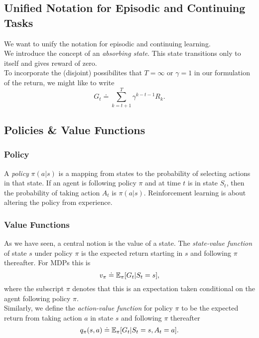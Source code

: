 \subsection{Unified Notation for Episodic and Continuing Tasks}
We want to unify the notation for episodic and continuing learning. \\

We introduce the concept of an \emph{absorbing state}. This state transitions only to itself and gives reward of zero.\\

To incorporate the (disjoint) possibilites that $T=\infty$ or $\gamma = 1$ in our formulation of the return, we might like to write
\begin{equation}
    G_t \doteq \sum_{k=t+1}^T \gamma^{k-t-1}R_k.
\end{equation}


\subsection{Policies \& Value Functions}
\subsubsection*{Policy}
A \emph{policy} $\pi(a|s)$ is a mapping from states to the probability of selecting actions in that state. If an agent is following policy $\pi$ and at time $t$ is in state $S_t$, then the probability of taking action $A_t$ is $\pi(a|s)$. Reinforcement learning is about altering the policy from experience.\\

\subsubsection*{Value Functions}
As we have seen, a central notion is the value of a state. The \emph{state-value function} of state $s$ under policy $\pi$ is the expected return starting in $s$ and following $\pi$ thereafter. For MDPs this is
\begin{equation}
    v_\pi \doteq \mathbb{E}_\pi[G_t | S_t = s],
\end{equation}
where the subscript $\pi$ denotes that this is an expectation taken conditional on the agent following policy $\pi$. \\

Similarly, we define the \emph{action-value function} for policy $\pi$ to be the expected return from taking action $a$ in state $s$ and following $\pi$ thereafter
\begin{equation}
    q_\pi(s, a) \doteq \mathbb{E}_\pi[G_t | S_t = s, A_t = a].
\end{equation}

